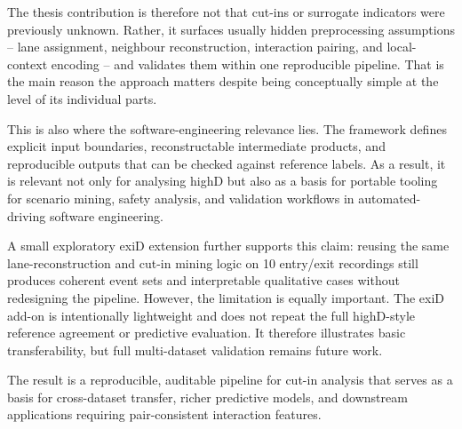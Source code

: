 \documentclass[12pt,a4paper,twoside,openright]{report}
\begin{document}
    The thesis contribution is therefore not that cut-ins or surrogate indicators were previously unknown. Rather, it surfaces usually hidden preprocessing assumptions -- lane assignment, neighbour reconstruction, interaction pairing, and local-context encoding -- and validates them within one reproducible pipeline. That is the main reason the approach matters despite being conceptually simple at the level of its individual parts.

    This is also where the software-engineering relevance lies. The framework defines explicit input boundaries, reconstructable intermediate products, and reproducible outputs that can be checked against reference labels. As a result, it is relevant not only for analysing highD but also as a basis for portable tooling for scenario mining, safety analysis, and validation workflows in automated-driving software engineering.

    A small exploratory exiD extension further supports this claim: reusing the same lane-reconstruction and cut-in mining logic on 10 entry/exit recordings still produces coherent event sets and interpretable qualitative cases without redesigning the pipeline. However, the limitation is equally important. The exiD add-on is intentionally lightweight and does not repeat the full highD-style reference agreement or predictive evaluation. It therefore illustrates basic transferability, but full multi-dataset validation remains future work.

    The result is a reproducible, auditable pipeline for cut-in analysis that serves as a basis for cross-dataset transfer, richer predictive models, and downstream applications requiring pair-consistent interaction features.
\end{document}
